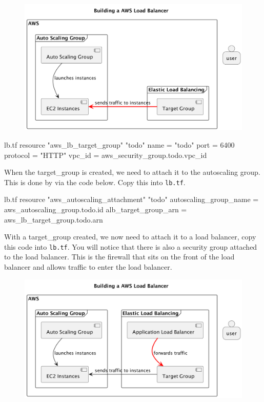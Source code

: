 \documentclass{csse4400}
\begin{document}
\begin{figure}[H]
  \begin{center}
    \includegraphics[scale=0.2]{diagrams/lb2}
  \end{center}
\end{figure}

\begin{code}[language=terraform,numbers=none,keepspaces=true]{lb.tf}
resource "aws_lb_target_group" "todo" {
  name     = "todo"
  port     = 6400
  protocol = "HTTP"
  vpc_id   = aws_security_group.todo.vpc_id
}
\end{code}

When the target\_group is created, we need to attach it to the autoscaling group.
This is done by via the code below. Copy this into \texttt{lb.tf}.

\begin{code}[language=terraform,numbers=none,keepspaces=true]{lb.tf}
resource "aws_autoscaling_attachment" "todo" {
  autoscaling_group_name = aws_autoscaling_group.todo.id
  alb_target_group_arn   = aws_lb_target_group.todo.arn
}
\end{code}

With a target\_group created, we now need to attach it to a load balancer, copy this code into \texttt{lb.tf}.
You will notice that there is also a security group attached to the load balancer.
This is the firewall that sits on the front of the load balancer and allows traffic to enter the load balancer.

\begin{figure}[H]
  \begin{center}
    \includegraphics[scale=0.2]{diagrams/lb3}
  \end{center}
\end{figure}
\end{document}

